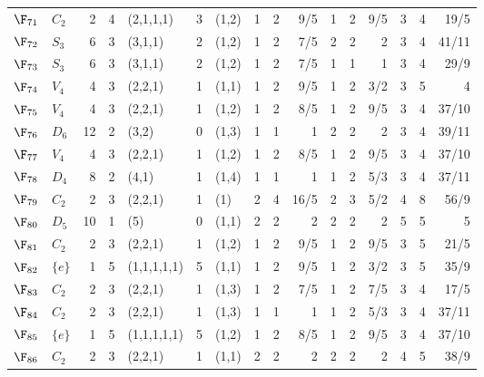 \begin{landscape}
{\begin{longtable}{@{}l l r r l r l rrr rrr rrr@{}}
\addlinespace[3pt]
\textbf{$\F_{71}$} & $C_{2}$ & 2 & 4 & (2,1,1,1) & 3 & (1,2) & 1 & 2 & 9/5 & 1 & 2 & 9/5 & 3 & 4 & 19/5 \\
\addlinespace[3pt]
\textbf{$\F_{72}$} & $S_{3}$ & 6 & 3 & (3,1,1) & 2 & (1,2) & 1 & 2 & 7/5 & 2 & 2 & 2 & 3 & 4 & 41/11 \\
\addlinespace[3pt]
\textbf{$\F_{73}$} & $S_{3}$ & 6 & 3 & (3,1,1) & 2 & (1,2) & 1 & 2 & 7/5 & 1 & 1 & 1 & 3 & 4 & 29/9 \\
\addlinespace[3pt]
\textbf{$\F_{74}$} & $V_{4}$ & 4 & 3 & (2,2,1) & 1 & (1,1) & 1 & 2 & 9/5 & 1 & 2 & 3/2 & 3 & 5 & 4 \\
\addlinespace[3pt]
\textbf{$\F_{75}$} & $V_{4}$ & 4 & 3 & (2,2,1) & 1 & (1,2) & 1 & 2 & 8/5 & 1 & 2 & 9/5 & 3 & 4 & 37/10 \\
\addlinespace[3pt]
\textbf{$\F_{76}$} & $D_{6}$ & 12 & 2 & (3,2) & 0 & (1,3) & 1 & 1 & 1 & 2 & 2 & 2 & 3 & 4 & 39/11 \\
\addlinespace[3pt]
\textbf{$\F_{77}$} & $V_{4}$ & 4 & 3 & (2,2,1) & 1 & (1,2) & 1 & 2 & 8/5 & 1 & 2 & 9/5 & 3 & 4 & 37/10 \\
\addlinespace[3pt]
\textbf{$\F_{78}$} & $D_{4}$ & 8 & 2 & (4,1) & 1 & (1,4) & 1 & 1 & 1 & 1 & 2 & 5/3 & 3 & 4 & 37/11 \\
\addlinespace[3pt]
\textbf{$\F_{79}$} & $C_{2}$ & 2 & 3 & (2,2,1) & 1 & (1) & 2 & 4 & 16/5 & 2 & 3 & 5/2 & 4 & 8 & 56/9 \\
\addlinespace[3pt]
\textbf{$\F_{80}$} & $D_{5}$ & 10 & 1 & (5) & 0 & (1,1) & 2 & 2 & 2 & 2 & 2 & 2 & 5 & 5 & 5 \\
\addlinespace[3pt]
\textbf{$\F_{81}$} & $C_{2}$ & 2 & 3 & (2,2,1) & 1 & (1,2) & 1 & 2 & 9/5 & 1 & 2 & 9/5 & 3 & 5 & 21/5 \\
\addlinespace[3pt]
\textbf{$\F_{82}$} & $\{e\}$ & 1 & 5 & (1,1,1,1,1) & 5 & (1,1) & 1 & 2 & 9/5 & 1 & 2 & 3/2 & 3 & 5 & 35/9 \\
\addlinespace[3pt]
\textbf{$\F_{83}$} & $C_{2}$ & 2 & 3 & (2,2,1) & 1 & (1,3) & 1 & 2 & 7/5 & 1 & 2 & 7/5 & 3 & 4 & 17/5 \\
\addlinespace[3pt]
\textbf{$\F_{84}$} & $C_{2}$ & 2 & 3 & (2,2,1) & 1 & (1,3) & 1 & 1 & 1 & 1 & 2 & 5/3 & 3 & 4 & 37/11 \\
\addlinespace[3pt]
\textbf{$\F_{85}$} & $\{e\}$ & 1 & 5 & (1,1,1,1,1) & 5 & (1,2) & 1 & 2 & 8/5 & 1 & 2 & 9/5 & 3 & 4 & 37/10 \\
\addlinespace[3pt]
\textbf{$\F_{86}$} & $C_{2}$ & 2 & 3 & (2,2,1) & 1 & (1,1) & 2 & 2 & 2 & 2 & 2 & 2 & 4 & 5 & 38/9 \\

\end{longtable}}
\end{landscape}
